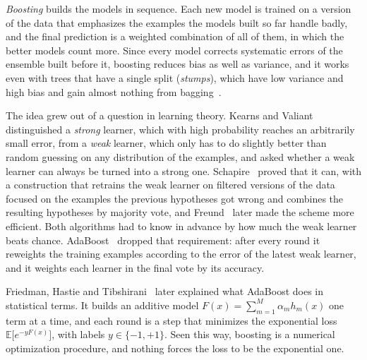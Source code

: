     \emph{Boosting} builds the models in sequence. Each new model is trained on
    a version of the data that emphasizes the examples the models built so far
    handle badly, and the final prediction is a weighted combination of all of
    them, in which the better models count more. Since every model corrects
    systematic errors of the ensemble built before it, boosting reduces bias as
    well as variance, and it works even with trees that have a single split
    (\emph{stumps}), which have low variance and high bias and gain almost nothing
    from bagging~\cite{friedman2000}.
    
    The idea grew out of a question in learning theory. Kearns and
    Valiant~\cite{kearns1994} distinguished a \emph{strong} learner, which with
    high probability reaches an arbitrarily small error, from a \emph{weak}
    learner, which only has to do slightly better than random guessing on any
    distribution of the examples, and asked whether a weak learner can always be
    turned into a strong one. Schapire~\cite{schapire1990} proved that it can,
    with a construction that retrains the weak learner on filtered versions of the
    data focused on the examples the previous hypotheses got wrong and combines
    the resulting hypotheses by majority vote, and Freund~\cite{freund1995} later
    made the scheme more efficient. Both algorithms had to know in advance by how
    much the weak learner beats chance. AdaBoost~\cite{freund1997} dropped that
    requirement: after every round it reweights the training examples according to
    the error of the latest weak learner, and it weights each learner in the final
    vote by its accuracy.
    
    Friedman, Hastie and Tibshirani~\cite{friedman2000} later explained what
    AdaBoost does in statistical terms. It builds an additive model
    $F(x) = \sum_{m=1}^{M} \alpha_m h_m(x)$ one term at a time, and each round is a
    step that minimizes the exponential loss $\mathbb{E}\bigl[e^{-y F(x)}\bigr]$,
    with labels $y \in \{-1, +1\}$. Seen this way, boosting is a numerical
    optimization procedure, and nothing forces the loss to be the exponential one.

